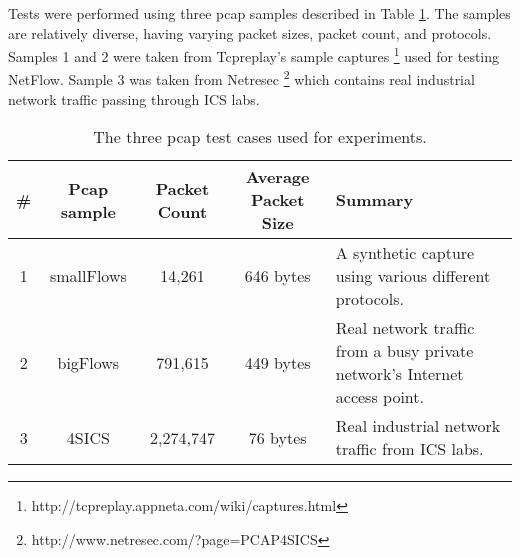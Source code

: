 Tests were performed using three pcap samples described in Table \ref{tbl:pcap}. 
The samples are relatively diverse, having varying packet sizes, packet count, and protocols. Samples 1 and 2 were taken from Tcpreplay's sample captures \footnote{http://tcpreplay.appneta.com/wiki/captures.html} used for testing NetFlow. Sample 3 was taken from Netresec \footnote{http://www.netresec.com/?page=PCAP4SICS} which contains real industrial network traffic passing through ICS labs.

\begin{table}[ht]
\caption{The three pcap test cases used for experiments.}
\begin{center}
\begin{tabularx}{\linewidth}{| c || c | c | c | X |}
\hline
\# & Pcap sample & Packet Count & Average Packet Size & Summary \\
\hline
1 & smallFlows & 14,261 & 646 bytes & A synthetic capture using various different protocols. \\
\hline
2 & bigFlows & 791,615 & 449 bytes & Real network traffic from a busy private network's Internet access point. \\
\hline
3 & 4SICS & 2,274,747 & 76 bytes & Real industrial network traffic from ICS labs. \\
\hline
\end{tabularx}
\end{center}
\label{tbl:pcap}
\end{table}


